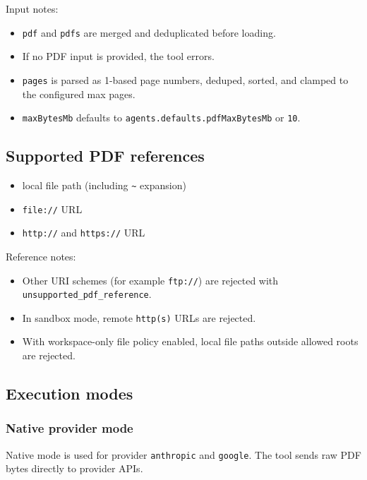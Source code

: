 Input notes:

\begin{itemize}
  \item \texttt{pdf} and \texttt{pdfs} are merged and deduplicated before loading.
  \item If no PDF input is provided, the tool errors.
  \item \texttt{pages} is parsed as 1-based page numbers, deduped, sorted, and clamped to the configured max pages.
  \item \texttt{maxBytesMb} defaults to \texttt{agents.defaults.pdfMaxBytesMb} or \texttt{10}.
\end{itemize}


\subsection{Supported PDF references}


\begin{itemize}
  \item local file path (including \texttt{\textasciitilde{}} expansion)
  \item \texttt{file://} URL
  \item \texttt{http://} and \texttt{https://} URL
\end{itemize}


Reference notes:

\begin{itemize}
  \item Other URI schemes (for example \texttt{ftp://}) are rejected with \texttt{unsupported\_pdf\_reference}.
  \item In sandbox mode, remote \texttt{http(s)} URLs are rejected.
  \item With workspace-only file policy enabled, local file paths outside allowed roots are rejected.
\end{itemize}


\subsection{Execution modes}


\subsubsection{Native provider mode}


Native mode is used for provider \texttt{anthropic} and \texttt{google}.
The tool sends raw PDF bytes directly to provider APIs.

